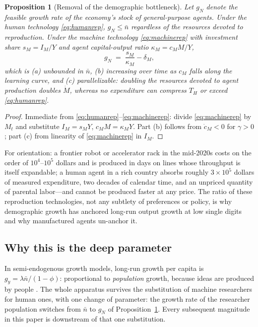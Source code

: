 \documentclass[11pt]{article}
\newtheorem{proposition}{Proposition}
\begin{document}
\begin{proposition}[Removal of the demographic bottleneck]\label{prop:bottleneck}
Let $g_N$ denote the feasible growth rate of the economy's stock of general-purpose agents. Under the human technology \eqref{eq:humanrep}, $g_N \le \bar n$ regardless of the resources devoted to reproduction. Under the machine technology \eqref{eq:machinerep} with investment share $s_M = I_M / Y$ and agent capital-output ratio $\kappa_M = c_M M / Y$,
\begin{equation}
g_N \;=\; \frac{s_M}{\kappa_M} - \delta_M,
\end{equation}
which is (a) unbounded in $\bar n$, (b) increasing over time as $c_M$ falls along the learning curve, and (c) parallelizable: doubling the resources devoted to agent production doubles $\dot M$, whereas no expenditure can compress $T_H$ or exceed \eqref{eq:humanrep}.
\end{proposition}

\begin{proof}
Immediate from \eqref{eq:humanrep}--\eqref{eq:machinerep}: divide \eqref{eq:machinerep} by $M_t$ and substitute $I_M = s_M Y$, $c_M M = \kappa_M Y$. Part (b) follows from $\dot c_M < 0$ for $\gamma > 0$; part (c) from linearity of \eqref{eq:machinerep} in $I_M$.
\end{proof}

For orientation: a frontier robot or accelerator rack in the mid-2020s costs on the order of $10^4$--$10^5$ dollars and is produced in days on lines whose throughput is itself expandable; a human agent in a rich country absorbs roughly $3\times 10^5$ dollars of measured expenditure, two decades of calendar time, and an unpriced quantity of parental labor---and cannot be produced faster at any price. The ratio of these reproduction technologies, not any subtlety of preferences or policy, is why demographic growth has anchored long-run output growth at low single digits \citep{jones2022} and why manufactured agents un-anchor it.

\subsection{Why this is the deep parameter}

In semi-endogenous growth models, long-run growth per capita is $g_y = \lambda \bar n / (1-\phi)$: proportional to \emph{population} growth, because ideas are produced by people \citep{jones1995}. The whole apparatus survives the substitution of machine researchers for human ones, with one change of parameter: the growth rate of the researcher population switches from $\bar n$ to $g_N$ of Proposition~\ref{prop:bottleneck}. Every subsequent magnitude in this paper is downstream of that one substitution.
\end{document}

